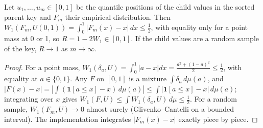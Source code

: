 \begin{proposition}\label{prop:randomness}
Let $u_1,\dots,u_m\in[0,1]$ be the quantile positions of the child values in the sorted parent key and $F_m$ their empirical distribution. Then $W_1(F_m,U(0,1))=\int_0^1|F_m(x)-x|\,dx\le\frac12$, with equality only for a point mass at 0 or 1, so $R=1-2W_1\in[0,1]$. If the child values are a random sample of the key, $R\to1$ as $m\to\infty$.
\end{proposition}
\begin{proof}
For a point mass, $W_1(\delta_a,U)=\int_0^1|a-x|dx=\frac{a^2+(1-a)^2}2\le\frac12$, with equality at $a\in\{0,1\}$. Any $F$ on $[0,1]$ is a mixture $\int\delta_a\,d\mu(a)$, and $|F(x)-x|=|\int(\mathbf 1[a\le x]-x)\,d\mu(a)|\le\int|\mathbf 1[a\le x]-x|\,d\mu(a)$; integrating over $x$ gives $W_1(F,U)\le\int W_1(\delta_a,U)\,d\mu\le\frac12$. For a random sample, $W_1(F_m,U)\to0$ almost surely (Glivenko--Cantelli on a bounded interval). The implementation integrates $|F_m(x)-x|$ exactly piece by piece.
\end{proof}


